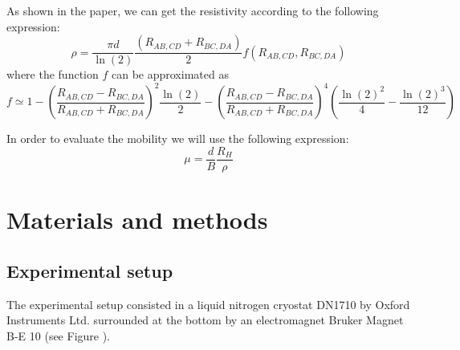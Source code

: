 \documentclass[11pt,a4paper]{article}
\begin{document}
As shown in the paper, we can get the resistivity according to the following expression:
\begin{equation}
\rho=\frac{\pi d}{\ln(2)}\frac{(R_{AB,CD}+R_{BC,DA})}{2}f\left(R_{AB,CD},R_{BC,DA}\right)
\end{equation}
where the function $f$ can be approximated as
\begin{equation}
f \simeq 1-\left(\frac{R_{AB,CD}-R_{BC,DA}}{R_{AB,CD}+R_{BC,DA}}\right)^2 \frac{\ln(2)}{2}-\left(\frac{R_{AB,CD}-R_{BC,DA}}{R_{AB,CD}+R_{BC,DA}}\right)^4\left(\frac{\ln(2)^2}{4}-\frac{\ln(2)^3}{12}\right)
\end{equation}

In order to evaluate the mobility we will use the following expression:
\begin{equation}
\mu=\frac{d}{B}\frac{R_H}{\rho}
\end{equation}

\section{Materials and methods}

\subsection{Experimental setup}

The experimental setup consisted in a liquid nitrogen cryostat DN1710 by Oxford Instruments Ltd. surrounded at the bottom by an electromagnet Bruker Magnet B-E 10 (see Figure ).
\end{document}
